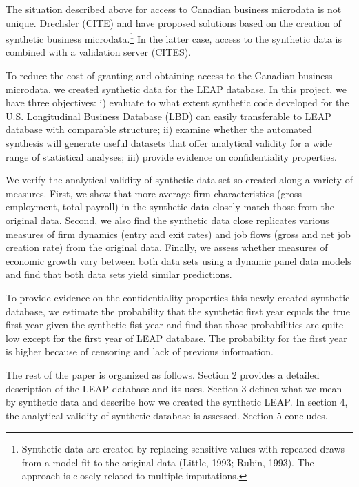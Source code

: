 \documentclass{article}
\begin{document}
The situation described above for access to Canadian business microdata is not unique. Drechsler (CITE) and \cite{RePEc:bla:istatr:v:79:y:2011:i:3:p:362-384} have proposed solutions based on the creation of synthetic business microdata.\footnote{Synthetic data are created by replacing sensitive values with repeated draws from a model fit to the original data (Little, 1993; Rubin, 1993). The approach is closely related to multiple imputations.} In the latter case, access to the synthetic data is combined with a validation server (CITES). 

To reduce the cost of granting and obtaining access to the Canadian business microdata, we created  synthetic data for the  \ac{LEAP} database. In this project, we have three objectives: i) evaluate to what extent synthetic code developed for the U.S. Longitudinal Business Database (LBD) can easily transferable to LEAP database with comparable structure; ii) examine whether the automated synthesis will generate useful datasets that offer analytical validity for a wide range of statistical analyses; iii) provide evidence on confidentiality properties. 


We verify the analytical validity of synthetic data set so created along a variety of measures. First, we show that more average firm characteristics (gross employment, total payroll) in the synthetic data closely match those from the original data. Second, we also find the synthetic data close replicates various measures of firm dynamics (entry and exit rates) and job flows (gross and net job creation rate) from the original data. Finally, we assess whether measures of economic growth vary between both data sets using a dynamic panel data models and find that both data sets yield similar predictions.

To provide evidence on the confidentiality properties this newly created  synthetic database, we estimate the probability that the synthetic first year equals the true first year given the synthetic fist year and find that those probabilities are quite low except for the first year of LEAP database. The probability for the first year is higher because of censoring and lack of previous information. 


The rest of the paper is organized as follows. Section 2 provides a detailed description of the LEAP database and its uses. Section 3 defines what we mean by synthetic data and describe how we created the synthetic LEAP. In section 4, the analytical validity of synthetic database is assessed. Section 5 concludes.
\end{document}
